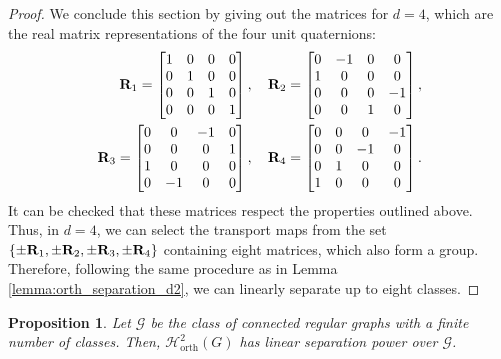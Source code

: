 \documentclass{article}
\newtheorem{proposition}[theorem]{Proposition}
\def\mR{{\bf{R}}}
\def\gG{{\mathcal{G}}}
\def\gH{{\mathcal{H}}}
\begin{document}
\begin{proof}
We conclude this section by giving out the matrices for $d=4$, which are the real matrix representations of the four unit quaternions:
\begin{align}
    \mR_1 = \begin{bmatrix}
    1 & 0 & 0 & 0 \\
    0 & 1 & 0 & 0 \\
    0 & 0 & 1 & 0 \\
    0 & 0 & 0 & 1 \\ 
    \end{bmatrix}
    ,\quad
    \mR_2 = \begin{bmatrix}
    0 & -1 & 0 & 0 \\
    1 & 0 & 0 & 0 \\
    0 & 0 & 0 & -1 \\
    0 & 0 & 1 & 0 \\ 
    \end{bmatrix}
    , \\
    \mR_3 = \begin{bmatrix}
    0 & 0 & -1 & 0 \\
    0 & 0 & 0 & 1 \\
    1 & 0 & 0 & 0 \\
    0 & -1 & 0 & 0 \\ 
    \end{bmatrix}
    ,\quad
    \mR_4 = \begin{bmatrix}
    0 & 0 & 0 & -1 \\
    0 & 0 & -1 & 0 \\
    0 & 1 & 0 & 0 \\
    1 & 0 & 0 & 0 \\ 
    \end{bmatrix} \nonumber.
\end{align}
It can be checked that these matrices respect the properties outlined above. Thus, in $d = 4$, we can select the transport maps from the set $\{ \pm\mR_1, \pm\mR_2, \pm\mR_3, \pm\mR_4 \}$ containing eight matrices, which also form a group. Therefore, following the same procedure as in Lemma \ref{lemma:orth_separation_d2}, we can linearly separate up to eight classes.  
\end{proof}

\begin{proposition}\label{prop:regular_orth_separation}
Let $\gG$ be the class of connected regular graphs with a finite number of classes. Then, $\gH_{\mathrm{orth}}^{2}(G)$ has linear separation power over $\gG$. 
\end{proposition}
\end{document}
